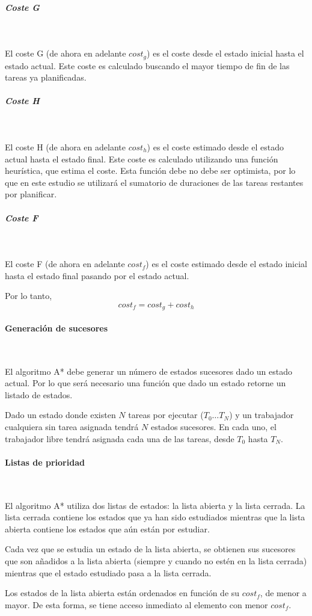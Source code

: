 \subparagraph{Coste G}~

El coste G (de ahora en adelante $cost_g$) es el coste desde el estado inicial
hasta el estado actual.
Este coste es calculado buscando el mayor tiempo de fin de
las tareas ya planificadas.

\subparagraph{Coste H}~

El coste H (de ahora en adelante $cost_h$) es el coste estimado desde el estado actual
hasta el estado final.
Este coste es calculado utilizando una función heurística,
que estima el coste.
Esta función debe no debe ser optimista,
por lo que en este estudio se utilizará el sumatorio de duraciones
de las tareas restantes por planificar.

\subparagraph{Coste F}~

El coste F (de ahora en adelante $cost_f$) es el coste estimado desde el estado inicial
hasta el estado final pasando por el estado actual.

Por lo tanto, \[cost_f = cost_g + cost_h\]

\paragraph{Generación de sucesores}~

El algoritmo A* debe generar un número de estados sucesores dado un estado actual.
Por lo que será necesario una función que dado un estado retorne un listado de estados.

Dado un estado donde existen $N$ tareas por ejecutar ($T_0 \dots T_N$) y
un trabajador cualquiera sin tarea asignada tendrá $N$ estados sucesores.
En cada uno, el trabajador libre tendrá asignada cada una de las tareas,
desde $T_0$ hasta $T_N$.

\paragraph{Listas de prioridad}~

El algoritmo A* utiliza dos listas de estados: la lista abierta y la lista cerrada.
La lista cerrada contiene los estados que ya han sido estudiados mientras que
la lista abierta contiene los estados que aún están por estudiar.

Cada vez que se estudia un estado de la lista abierta,
se obtienen sus sucesores que son añadidos a la lista abierta
(siempre y cuando no estén en la lista cerrada)
mientras que el estado estudiado pasa a la lista cerrada.

Los estados de la lista abierta están ordenados en función de su $cost_f$,
de menor a mayor.
De esta forma, se tiene acceso inmediato al elemento con menor $cost_f$.

